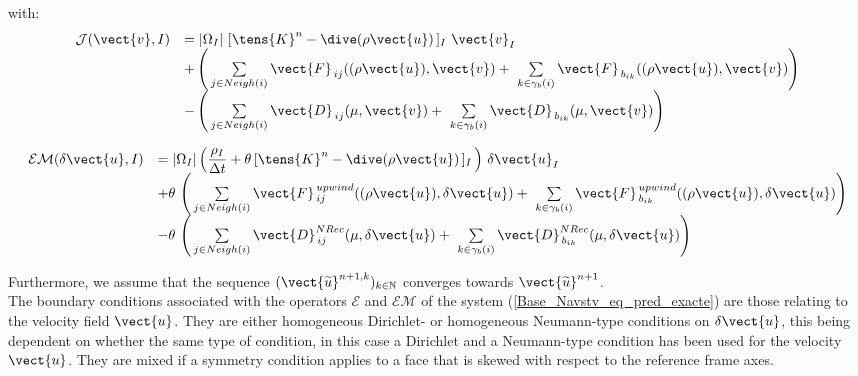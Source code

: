 with:
\begin{equation}\notag
\begin{array}{ll}
\mathcal{J}(\vect{v},I) & = |{\Omega_I}|\,\,[\tens{K}^{n}-\dive(\rho \vect{u})\,]_{I}\,\,\vect{v}_{I} \\
& + \left(\,\sum\limits_{j\in Neigh(i)}{\vect{F}_{\,ij}((\rho\vect{u}),\vect{v})}
+\,\,\sum\limits_{k\in {\gamma_b(i)}} {\vect{F}_{\,{b}_{ik}}((\rho \vect{u}),\vect{v})}\right)\\
&-\left(\,\sum\limits_{j\in Neigh(i)}{\vect{D}_{\,ij}(\mu,\vect{v})}
+\,\,\sum\limits_{k\in {\gamma_b(i)}} {\vect{D}_{\,{b}_{ik}}(\mu,\vect{v})}\right)\\
\end{array}
\end{equation}

\begin{equation}\notag
\begin{array}{ll}
\mathcal{EM}(\delta\vect{u},I) & =
|{\Omega_I}| \left( \displaystyle\frac{\rho_I}{\Delta t} +\theta\,[\tens{K}^{n}-\dive(\rho \vect{u})\,]_{I}\,\right)\,\delta\vect{u}_{I}\\
&+\theta\,\left(\,\sum\limits_{j\in Neigh(i)}{\vect{F}^{\,upwind}_{\,ij}((\rho\vect{u}),\delta\vect{u})}
+\,\,\sum\limits_{k\in {\gamma_b(i)}} {\vect{F}^{\,upwind}_{\,{b}_{ik}}((\rho \vect{u}),\delta\vect{u})}\right)\\
&-\theta\,\left(\,\sum\limits_{j\in Neigh(i)}{\vect{D}^{NRec}_{\,ij}(\mu,\delta\vect{u})}
+\,\,\sum\limits_{k\in {\gamma_b(i)}} {\vect{D}^{NRec}_{\,{b}_{ik}}(\mu,\delta\vect{u})}\right)\\
\end{array}
\end{equation}


Furthermore, we assume that the sequence  $(\vect{\widetilde{u}}^{n+1,k})_{k\in \mathbb{N}}$
converges %
towards $\vect{\widetilde{u}}^{n+1}$.\\

The boundary conditions associated with the operators $\mathcal{E}$ and
$\mathcal{EM}$ of the system (\ref{Base_Navstv_eq_pred_exacte}) are those relating to the velocity field $\vect{u}$. They are either homogeneous Dirichlet- or homogeneous Neumann-type conditions on $\delta\vect{u}$, this being dependent on whether the same type of condition, in this case a Dirichlet and a Neumann-type condition has been used for the velocity $\vect{u}$. They are mixed if a symmetry condition applies to a face that is skewed with respect to the reference frame axes.

